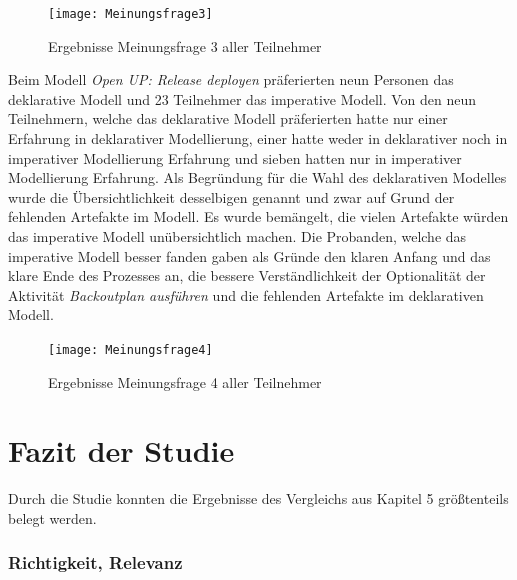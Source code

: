 \begin{figure}[htp]
\begin{center}
  \texttt{[image: Meinungsfrage3]} %
  \caption{Ergebnisse Meinungsfrage 3 aller Teilnehmer}
  \label{fig:Meinungsfrage3}
\end{center}
\end{figure}

Beim Modell \textit{Open UP: Release deployen} präferierten neun Personen das deklarative Modell und 23 Teilnehmer das imperative Modell. Von den neun Teilnehmern, welche das deklarative Modell präferierten hatte nur einer Erfahrung in deklarativer Modellierung, einer hatte weder in deklarativer noch in imperativer Modellierung Erfahrung und sieben hatten nur in imperativer Modellierung Erfahrung. \newline
Als Begründung für die Wahl des deklarativen Modelles wurde die Übersichtlichkeit desselbigen genannt und zwar auf Grund der fehlenden Artefakte im Modell. Es wurde bemängelt, die vielen Artefakte würden das imperative Modell unübersichtlich machen.\newline
Die Probanden, welche das imperative Modell besser fanden gaben als Gründe den klaren Anfang und das klare Ende des Prozesses an, die bessere Verständlichkeit der Optionalität der Aktivität \textit{Backoutplan ausführen} und die fehlenden Artefakte im deklarativen Modell. \newline



\begin{figure}[htp]
\begin{center}
  \texttt{[image: Meinungsfrage4]} %
  \caption{Ergebnisse Meinungsfrage 4 aller Teilnehmer}
  \label{fig:Meinungsfrage4}
\end{center}
\end{figure}

\clearpage

\section{Fazit der Studie}

Durch die Studie konnten die Ergebnisse des Vergleichs aus Kapitel 5 größtenteils belegt werden.\newline

\subsubsection{Richtigkeit, Relevanz}


